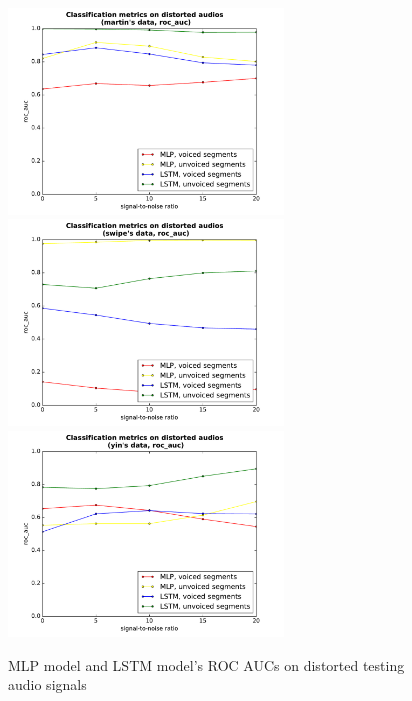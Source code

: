 \documentclass[11pt,a4paper]{report}
\begin{document}
\begin{figure}[htbp]
  \centering
  \includegraphics[width=0.65\textwidth]{classification_metrics_martin_roc_auc.pdf}
  \includegraphics[width=0.65\textwidth]{classification_metrics_swipe_roc_auc.pdf}
  \includegraphics[width=0.65\textwidth]{classification_metrics_yin_roc_auc.pdf}
  \caption{MLP model and LSTM model's ROC AUCs on distorted testing audio signals}
  \label{fig:distorted-testing-data-roc-auc}
\end{figure}
\end{document}
